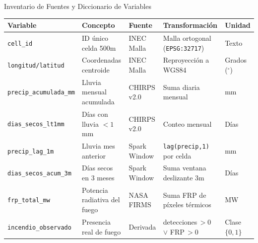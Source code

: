 \documentclass[aspectratio=169,11pt]{beamer}
\newcommand{\seccionactual}{Sustentaci\'on Final}
\begin{document}
\renewcommand{\seccionactual}{Variables \& Unidades}
\begin{frame}{Inventario de Fuentes y Diccionario de Variables}
  \begin{table}[H]
    \centering\tiny
    \begin{tabularx}{\textwidth}{@{}l X l X l@{}}
      \toprule
      \textbf{Variable} & \textbf{Concepto} & \textbf{Fuente} & \textbf{Transformaci\'on} & \textbf{Unidad} \\
      \midrule
      \texttt{cell\_id} & ID \'unico celda 500m & INEC Malla & Malla ortogonal (\texttt{EPSG:32717}) & Texto \\
      \texttt{longitud/latitud} & Coordenadas centroide & INEC Malla & Reproyecci\'on a WGS84 & Grados ($^\circ$) \\
      \texttt{precip\_acumulada\_mm} & Lluvia mensual acumulada & CHIRPS v2.0 & Suma diaria mensual & mm \\
      \texttt{dias\_secos\_lt1mm} & D\'ias con lluvia $<1$\,mm & CHIRPS v2.0 & Conteo mensual & D\'ias \\
      \texttt{precip\_lag\_1m} & Lluvia mes anterior & Spark Window & \texttt{lag(precip,1)} por celda & mm \\
      \texttt{dias\_secos\_acum\_3m} & D\'ias secos en 3 meses & Spark Window & Suma ventana deslizante 3m & D\'ias \\
      \texttt{frp\_total\_mw} & Potencia radiativa del fuego & NASA FIRMS & Suma FRP de p\'ixeles t\'ermicos & MW \\
      \texttt{incendio\_observado} & Presencia real de fuego & Derivada & detecciones\,$>0$ $\vee$ FRP\,$>0$ & Clase $\{0,1\}$ \\
      \bottomrule
    \end{tabularx}
  \end{table}
\end{frame}
\end{document}
